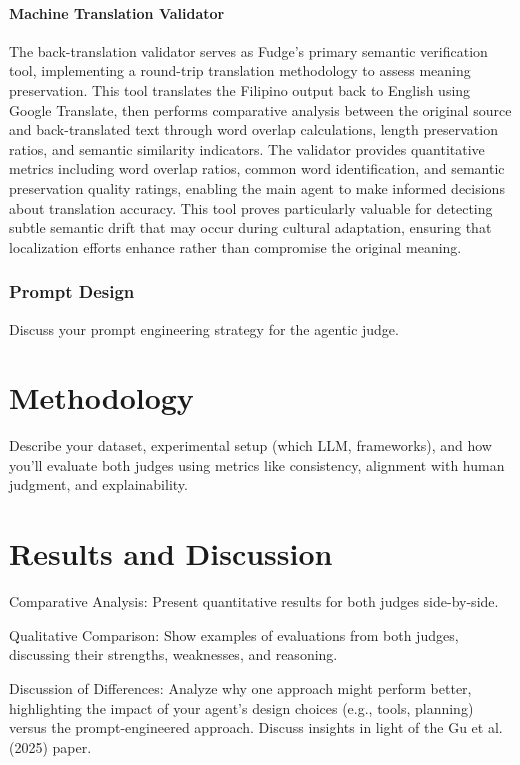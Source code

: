 \documentclass[conference]{IEEEtran}
\begin{document}
\paragraph{Machine Translation Validator} The back-translation validator serves as Fudge's primary semantic verification tool, implementing a round-trip translation methodology to assess meaning preservation. This tool translates the Filipino output back to English using Google Translate, then performs comparative analysis between the original source and back-translated text through word overlap calculations, length preservation ratios, and semantic similarity indicators. The validator provides quantitative metrics including word overlap ratios, common word identification, and semantic preservation quality ratings, enabling the main agent to make informed decisions about translation accuracy. This tool proves particularly valuable for detecting subtle semantic drift that may occur during cultural adaptation, ensuring that localization efforts enhance rather than compromise the original meaning.

\subsubsection{Prompt Design}

Discuss your prompt engineering strategy for the agentic judge.

\section{Methodology}

 Describe your dataset, experimental setup (which LLM, frameworks), and how you'll evaluate both judges using metrics like consistency, alignment with human judgment, and explainability.

 
\section{Results and Discussion}


Comparative Analysis: Present quantitative results for both judges side-by-side.

Qualitative Comparison: Show examples of evaluations from both judges, discussing their strengths, weaknesses, and reasoning.

Discussion of Differences: Analyze why one approach might perform better, highlighting the impact of your agent's design choices (e.g., tools, planning) versus the prompt-engineered approach. Discuss insights in light of the Gu et al. (2025) paper.
\end{document}
